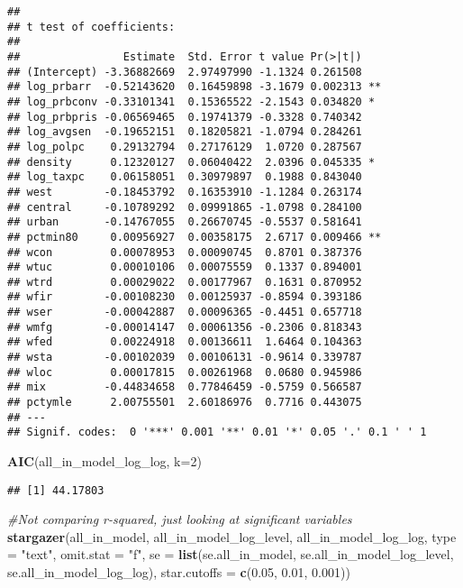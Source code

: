 \documentclass[
]{article}
\newenvironment{Shaded}{\begin{snugshade}}{\end{snugshade}}
\newcommand{\CommentTok}[1]{\textcolor[rgb]{0.56,0.35,0.01}{\textit{#1}}}
\newcommand{\DataTypeTok}[1]{\textcolor[rgb]{0.13,0.29,0.53}{#1}}
\newcommand{\DecValTok}[1]{\textcolor[rgb]{0.00,0.00,0.81}{#1}}
\newcommand{\FloatTok}[1]{\textcolor[rgb]{0.00,0.00,0.81}{#1}}
\newcommand{\KeywordTok}[1]{\textcolor[rgb]{0.13,0.29,0.53}{\textbf{#1}}}
\newcommand{\NormalTok}[1]{#1}
\newcommand{\StringTok}[1]{\textcolor[rgb]{0.31,0.60,0.02}{#1}}
\begin{document}
\begin{verbatim}
## 
## t test of coefficients:
## 
##                Estimate  Std. Error t value Pr(>|t|)   
## (Intercept) -3.36882669  2.97497990 -1.1324 0.261508   
## log_prbarr  -0.52143620  0.16459898 -3.1679 0.002313 **
## log_prbconv -0.33101341  0.15365522 -2.1543 0.034820 * 
## log_prbpris -0.06569465  0.19741379 -0.3328 0.740342   
## log_avgsen  -0.19652151  0.18205821 -1.0794 0.284261   
## log_polpc    0.29132794  0.27176129  1.0720 0.287567   
## density      0.12320127  0.06040422  2.0396 0.045335 * 
## log_taxpc    0.06158051  0.30979897  0.1988 0.843040   
## west        -0.18453792  0.16353910 -1.1284 0.263174   
## central     -0.10789292  0.09991865 -1.0798 0.284100   
## urban       -0.14767055  0.26670745 -0.5537 0.581641   
## pctmin80     0.00956927  0.00358175  2.6717 0.009466 **
## wcon         0.00078953  0.00090745  0.8701 0.387376   
## wtuc         0.00010106  0.00075559  0.1337 0.894001   
## wtrd         0.00029022  0.00177967  0.1631 0.870952   
## wfir        -0.00108230  0.00125937 -0.8594 0.393186   
## wser        -0.00042887  0.00096365 -0.4451 0.657718   
## wmfg        -0.00014147  0.00061356 -0.2306 0.818343   
## wfed         0.00224918  0.00136611  1.6464 0.104363   
## wsta        -0.00102039  0.00106131 -0.9614 0.339787   
## wloc         0.00017815  0.00261968  0.0680 0.945986   
## mix         -0.44834658  0.77846459 -0.5759 0.566587   
## pctymle      2.00755501  2.60186976  0.7716 0.443075   
## ---
## Signif. codes:  0 '***' 0.001 '**' 0.01 '*' 0.05 '.' 0.1 ' ' 1
\end{verbatim}

\begin{Shaded}
\begin{Highlighting}[]
\KeywordTok{AIC}\NormalTok{(all_in_model_log_log, }\DataTypeTok{k=}\DecValTok{2}\NormalTok{)}
\end{Highlighting}
\end{Shaded}

\begin{verbatim}
## [1] 44.17803
\end{verbatim}

\begin{Shaded}
\begin{Highlighting}[]
\CommentTok{#Not comparing r-squared, just looking at significant variables}
\KeywordTok{stargazer}\NormalTok{(all_in_model, all_in_model_log_level, }
\NormalTok{          all_in_model_log_log,}
          \DataTypeTok{type =} \StringTok{"text"}\NormalTok{, }\DataTypeTok{omit.stat =} \StringTok{"f"}\NormalTok{,}
          \DataTypeTok{se =} \KeywordTok{list}\NormalTok{(se.all_in_model, se.all_in_model_log_level,}
\NormalTok{                    se.all_in_model_log_log),}
          \DataTypeTok{star.cutoffs =} \KeywordTok{c}\NormalTok{(}\FloatTok{0.05}\NormalTok{, }\FloatTok{0.01}\NormalTok{, }\FloatTok{0.001}\NormalTok{))}
\end{Highlighting}
\end{Shaded}
\end{document}
